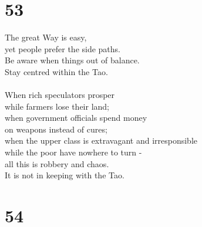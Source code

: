 \documentclass[b5paper, 12pt, oneside]{book}
\begin{document}
\chapter*{53}
The great Way is easy,\\
yet people prefer the side paths.\\
Be aware when things out of balance.\\
Stay centred within the Tao.\\
\\
When rich speculators prosper\\
while farmers lose their land;\\
when government officials spend money\\
on weapons instead of cures;\\
when the upper class is extravagant and irresponsible\\
while the poor have nowhere to turn - \\
all this is robbery and chaos.\\
It is not in keeping with the Tao.

\chapter*{54}
\end{document}
